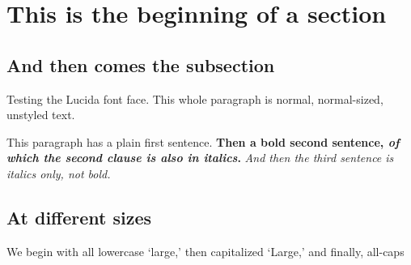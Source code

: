 \documentclass[12pt]{article}
\begin{document}
\section{This is the beginning of a section}

\subsection{And then comes the subsection}

Testing the Lucida font face. This whole paragraph is normal, normal-sized, unstyled text.

This paragraph has a plain first sentence.
\textbf{Then a bold second sentence, \emph{of which the second clause is also in italics}.}
\emph{And then the third sentence is italics only, not bold.}

\subsection{At different sizes}

{\large We begin with all lowercase `large,' {\Large then capitalized `Large,' {\LARGE and finally, all-caps}}}
\end{document}
